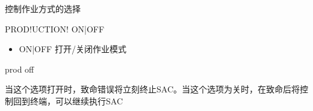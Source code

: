 \label{cmd:production}

控制作业方式的选择

\begin{SACSTX}
PROD!UCTION! ON|OFF
\end{SACSTX}

\begin{itemize}
\item ON|OFF 打开/关闭作业模式
\end{itemize}

\begin{SACDFT}
prod off
\end{SACDFT}

当这个选项打开时，致命错误将立刻终止SAC。当这个选项为关时，在致命后将控制回到终端，可以继续执行SAC
